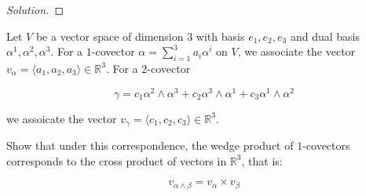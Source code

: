 \documentclass[10pt]{article}
\newenvironment{problem}[2][]{\begin{trivlist}
\item[\hskip \labelsep {\bfseries #1}\hskip \labelsep {\bfseries #2.}]}{\end{trivlist}}
\begin{document}
\begin{proof}[Solution]

\end{proof}

\begin{problem}{Question 3}

Let $V$ be a vector space of dimension 3 with basis $e_1, e_2, e_3$ and dual basis $\alpha^1, \alpha^2, \alpha^3$. For a $1$-covector $\alpha = \sum_{i=1}^3 a_i \alpha^i$ on $V$, we associate the vector $v_\alpha = \langle a_1, a_2, a_3 \rangle \in \mathbb{R}^3$. For a $2$-covector

$$ \gamma = c_1 \alpha^2 \wedge \alpha^3 + c_2 \alpha^3 \wedge \alpha^1 + c_3 \alpha^1 \wedge \alpha^2$$

we assoicate the vector $v_\gamma = \langle c_1, c_2, c_3 \rangle \in \mathbb{R}^3$.

Show that under this correspondence, the wedge product of $1$-covectors corresponds to the cross product of vectors in $\mathbb{R}^3$, that is:

$$ v_{\alpha \wedge \beta} = v_\alpha \times v_\beta $$

\end{problem}
\end{document}
